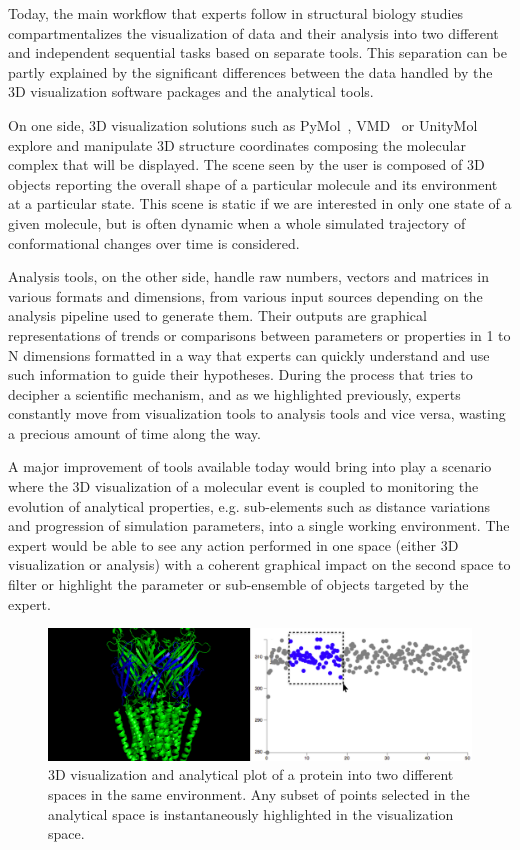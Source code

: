 \documentclass{vgtc}                          %
\begin{document}
Today, the main workflow that experts follow in structural biology studies compartmentalizes the visualization of data and their analysis into two different and independent sequential tasks based on separate tools. This separation can be partly explained by the significant differences between the data handled by the 3D visualization software packages and the analytical tools.

On one side, 3D visualization solutions such as PyMol~\cite{delano_pymol_2002}, VMD~\cite{humphrey_vmd:_1996} or UnityMol~\cite{lv2013game} explore and manipulate 3D structure coordinates composing the molecular complex that will be displayed. The scene seen by the user is composed of 3D objects reporting the overall shape of a particular molecule and its environment at a particular state. This scene is static if we are interested in only one state of a given molecule, but is often dynamic when a whole simulated trajectory of conformational changes over time is considered.

Analysis tools, on the other side, handle raw numbers, vectors and matrices in various formats and dimensions, from various input sources depending on the analysis pipeline used to generate them. Their outputs are graphical representations of trends or comparisons between parameters or properties in 1 to N dimensions formatted in a way that experts can quickly understand and use such information to guide their hypotheses.
During the process that tries to decipher a scientific mechanism, and as we highlighted previously, experts constantly move from visualization tools to analysis tools and vice versa, wasting a precious amount of time along the way.

A major improvement of tools available today would bring into play a scenario where the 3D visualization of a molecular event is coupled to monitoring the evolution of analytical properties, e.g. sub-elements such as distance variations and progression of simulation parameters, into a single working environment. The expert would be able to see any action performed in one space (either 3D visualization or analysis) with a coherent graphical impact on the second space to filter or highlight the parameter or sub-ensemble of objects targeted by the expert.

\begin{figure}[htb]
  \centering
  \includegraphics[width=\linewidth, frame]{figures/interactive_selection_def.pdf}
  \caption{3D visualization and analytical plot of a protein into two different spaces in the same environment. Any subset of points selected in the analytical space is instantaneously highlighted in the visualization space.}
  \label{interactive_selection}
\end{figure}
\end{document}
